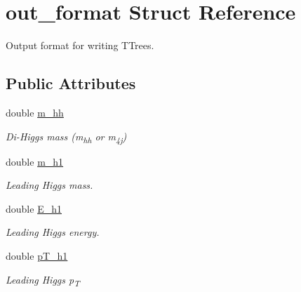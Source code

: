 \hypertarget{structout__format}{}\section{out\+\_\+format Struct Reference}
\label{structout__format}


Output format for writing T\+Trees.  


\subsection*{Public Attributes}
\begin{DoxyCompactItemize}
\item 
\mbox{\label{structout__format_a3e553bbd3fabf61be6a1c07054bafd8b}} 
double \mbox{\hyperlink{structout__format_a3e553bbd3fabf61be6a1c07054bafd8b}{m\+\_\+hh}}
\begin{DoxyCompactList}\small\item\em Di-\/\+Higgs mass (m\textsubscript{hh} or m\textsubscript{4j}) \end{DoxyCompactList}\item 
\mbox{\label{structout__format_a27c9f94da952a52d289a52414b5c07f2}} 
double \mbox{\hyperlink{structout__format_a27c9f94da952a52d289a52414b5c07f2}{m\+\_\+h1}}
\begin{DoxyCompactList}\small\item\em Leading Higgs mass. \end{DoxyCompactList}\item 
\mbox{\label{structout__format_a0cfb25b4806aa4b246ab4be41079ed1c}} 
double \mbox{\hyperlink{structout__format_a0cfb25b4806aa4b246ab4be41079ed1c}{E\+\_\+h1}}
\begin{DoxyCompactList}\small\item\em Leading Higgs energy. \end{DoxyCompactList}\item 
\mbox{\label{structout__format_a0ad2d778eae4d2991a2113d2a1f83dea}} 
double \mbox{\hyperlink{structout__format_a0ad2d778eae4d2991a2113d2a1f83dea}{p\+T\+\_\+h1}}
\begin{DoxyCompactList}\small\item\em Leading Higgs p\textsubscript{T} \end{DoxyCompactList}\item 

\end{DoxyCompactItemize}
